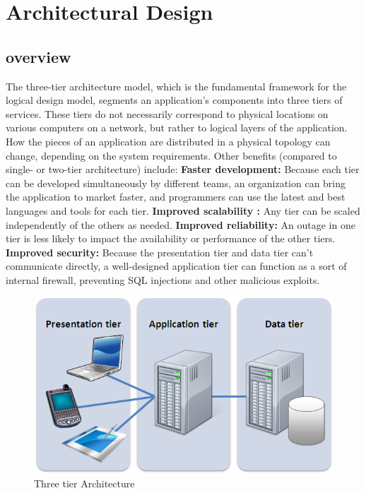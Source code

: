 \section{Architectural Design}
\subsection{overview}
The three-tier architecture model, which is the fundamental framework for the logical design model, segments an application's components into three tiers of services. These tiers do not necessarily correspond to physical locations on various computers on a network, but rather to logical layers of the application. How the pieces of an application are distributed in a physical topology can change, depending on the system requirements.
\newline
\newline
Other benefits (compared to single- or two-tier architecture) include:
\newline
 \textbf{Faster development:} Because each tier can be developed simultaneously by different teams, an organization can bring the application to market faster, and programmers can use the latest and best languages and tools for each tier.\newline\newline
 \textbf{Improved scalability :} Any tier can be scaled independently of the others as needed.\newline\newline
\textbf{Improved reliability:} An outage in one tier is less likely to impact the availability or performance of the other tiers.\newline\newline
\textbf{Improved security:} Because the presentation tier and data tier can't communicate directly, a well-designed application tier can function as a sort of internal firewall, preventing SQL injections and other malicious exploits.\newline\newline


\begin{figure}[H]
\includegraphics[width=1\textwidth]{figures/HighArchitecture.png}
\caption{\label{fig:student } Three tier Architecture }
\end{figure}

